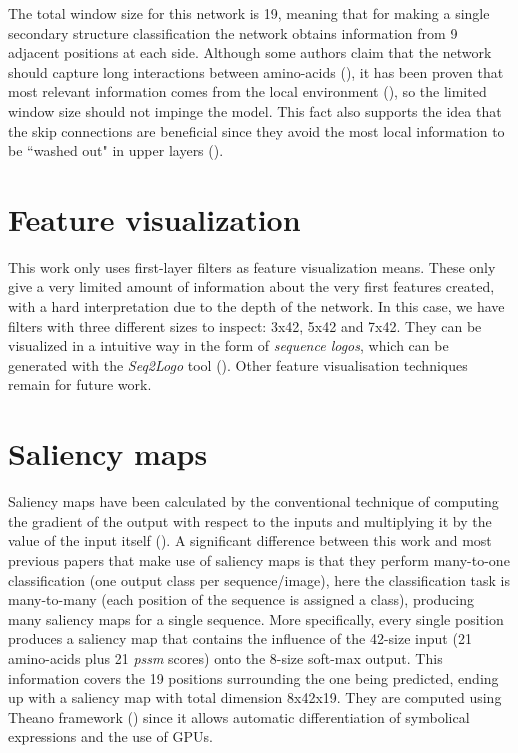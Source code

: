 The total window size for this network is 19, meaning that for making a single secondary structure classification the network obtains information from 9 adjacent positions at each side. Although some authors claim that the network should capture long interactions between amino-acids (\cite{Li2016,Lin2016,Hattori2017,Heffernan2017}), it has been proven that most relevant information comes from the local environment (\cite{Busia2017}), so the limited window size should not impinge the model. This fact also supports the idea that the skip connections are beneficial since they avoid the most local information to be ``washed out" in upper layers (\cite{Busia2017}).



\section{Feature visualization}
This work only uses first-layer filters as feature visualization means. These only give a very limited amount of information about the very first features created, with a hard interpretation due to the depth of the network. In this case, we have filters with three different sizes to inspect: 3x42, 5x42 and 7x42. They can be visualized in a intuitive way in the form of \textit{sequence logos}, which can be generated with the \textit{Seq2Logo} tool (\cite{Thomsen2012}). Other feature visualisation techniques remain for future work.


\section{Saliency maps} \label{sect:saliency}


Saliency maps have been calculated by the conventional technique of computing the gradient of the output with respect to the inputs and multiplying it by the value of the input itself (\cite{Shrikumar2016}). A significant difference between this work and most previous papers that make use of saliency maps is that they perform many-to-one classification (one output class per sequence/image), here the classification task is many-to-many (each position of the sequence is assigned a class), producing many saliency maps for a single sequence. More specifically, every single position produces a saliency map that contains the influence of the 42-size input (21 amino-acids plus 21 \textit{pssm} scores) onto the 8-size soft-max output. This information covers the 19 positions surrounding the one being predicted, ending up with a saliency map with total dimension 8x42x19. They are computed using Theano framework (\cite{TheTheanoDevelopmentTeam2016}) since it allows automatic differentiation of symbolical expressions and the use of GPUs.

